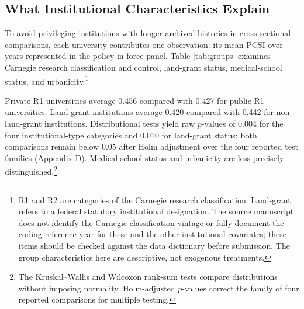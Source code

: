 \documentclass[11pt]{article}
\begin{document}
\subsection{What Institutional Characteristics Explain}
To avoid privileging institutions with longer archived histories in cross-sectional comparisons, each university contributes one observation: its mean PCSI over years represented in the policy-in-force panel. Table \ref{tab:groups} examines Carnegie research classification and control, land-grant status, medical-school status, and urbanicity.\footnote{R1 and R2 are categories of the Carnegie research classification. Land-grant refers to a federal statutory institutional designation. The source manuscript does not identify the Carnegie classification vintage or fully document the coding reference year for these and the other institutional covariates; these items should be checked against the data dictionary before submission. The group characteristics here are descriptive, not exogenous treatments.}

Private R1 universities average 0.456 compared with 0.427 for public R1 universities. Land-grant institutions average 0.420 compared with 0.442 for non-land-grant institutions. Distributional tests yield raw $p$-values of 0.004 for the four institutional-type categories and 0.010 for land-grant status; both comparisons remain below 0.05 after Holm adjustment over the four reported test families (Appendix D). Medical-school status and urbanicity are less precisely distinguished.\footnote{The Kruskal--Wallis and Wilcoxon rank-sum tests compare distributions without imposing normality. Holm-adjusted $p$-values correct the family of four reported comparisons for multiple testing.}
\end{document}
